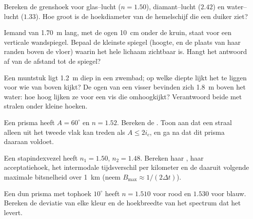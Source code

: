 \begin{exercise}[$\star$]\label{exo:b1:rays-reflection-refraction:3}
Bereken de grenshoek voor glas--lucht ($n = 1.50$), diamant--lucht
($2.42$) en water--lucht ($1.33$). Hoe groot is de hoekdiameter van de
hemelschijf die een duiker ziet?
\end{exercise}

\begin{exercise}[$\star$]\label{exo:b1:rays-reflection-refraction:4}
Iemand van \qty{1.70}{m} lang, met de ogen \qty{10}{cm} onder de kruin, staat
voor een verticale wandspiegel. Bepaal de kleinste spiegel (hoogte, en de
plaats van haar randen boven de vloer) waarin het hele lichaam zichtbaar is.
Hangt het antwoord af van de afstand tot de spiegel?
\end{exercise}

\begin{exercise}[$\star\star$]\label{exo:b1:rays-reflection-refraction:5}
Een muntstuk ligt \qty{1.2}{m} diep in een zwembad; op welke diepte lijkt het
te liggen voor wie van boven kijkt? De ogen van een visser bevinden zich
\qty{1.8}{m} boven het water: hoe hoog lijken ze voor een vis die omhoogkijkt?
Verantwoord beide met stralen onder kleine hoeken.
\end{exercise}

\begin{exercise}[$\star\star$]\label{exo:b1:rays-reflection-refraction:6}
Een prisma heeft $A = 60^\circ$ en $n = 1.52$. Bereken de . Toon aan dat een straal alleen uit het tweede vlak kan treden als
$A \leq 2 i_c$, en ga na dat dit prisma daaraan voldoet.
\end{exercise}

\begin{exercise}[$\star\star$]\label{exo:b1:rays-reflection-refraction:7}
Een stapindexvezel heeft $n_1 = 1.50$, $n_2 = 1.48$. Bereken haar
, haar acceptatiehoek, het intermodale tijdsverschil per
kilometer en de daaruit volgende maximale bitsnelheid over \qty{1}{km}
(neem $B_{\max} \approx 1/(2\Delta t)$).
\end{exercise}

\begin{exercise}[$\star\star$]\label{exo:b1:rays-reflection-refraction:8}
Een dun prisma met tophoek $10^\circ$ heeft $n = 1.510$ voor rood en $1.530$
voor blauw. Bereken de deviatie van elke kleur en de hoekbreedte van het
spectrum dat het levert.
\end{exercise}

